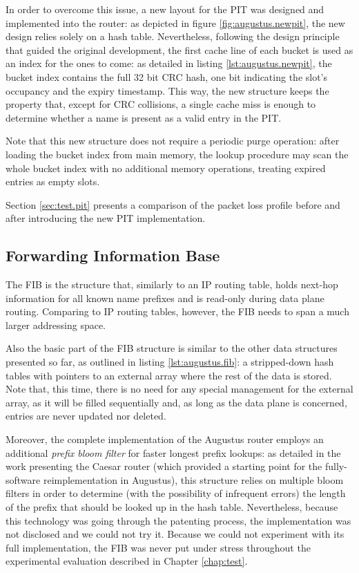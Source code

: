 \documentclass[11pt,a4paper,twoside,titlepage,openany]{book}
\begin{document}
In order to overcome this issue, a new layout for the PIT was designed and implemented into the router: as depicted in figure \ref{fig:augustus.newpit}, the new design relies solely on a hash table. Nevertheless, following the design principle that guided the original development, the first cache line of each bucket is used as an index for the ones to come: as detailed in listing \ref{lst:augustus.newpit}, the bucket index contains the full 32 bit CRC hash, one bit indicating the slot's occupancy and the expiry timestamp. This way, the new structure keeps the property that, except for CRC collisions, a single cache miss is enough to determine whether a name is present as a valid entry in the PIT.

Note that this new structure does not require a periodic purge operation: after loading the bucket index from main memory, the lookup procedure may scan the whole bucket index with no additional memory operations, treating expired entries as empty slots.

Section \ref{sec:test.pit} presents a comparison of the packet loss profile before and after introducing the new PIT implementation.

\subsection{Forwarding Information Base}\label{sec:augustus.fib}
The \gls{FIB} is the structure that, similarly to an IP routing table, holds next-hop information for all known name prefixes and is read-only during data plane routing. Comparing to IP routing tables, however, the \gls{FIB} needs to span a much larger addressing space.

Also the basic part of the FIB structure is similar to the other data structures presented so far, as outlined in listing \ref{lst:augustus.fib}: a stripped-down hash tables with pointers to an external array where the rest of the data is stored. Note that, this time, there is no need for any special management for the external array, as it will be filled sequentially and, as long as the data plane is concerned, entries are never updated nor deleted.

Moreover, the complete implementation of the Augustus router employs an additional \emph{prefix bloom filter} for faster longest prefix lookups: as detailed in the work presenting the Caesar router \cite{caesar} (which provided a starting point for the fully-software reimplementation in Augustus), this structure relies on multiple bloom filters in order to determine (with the possibility of infrequent errors) the length of the prefix that should be looked up in the hash table.
Nevertheless, because this technology was going through the patenting process, the implementation was not disclosed and we could not try it.
Because we could not experiment with its full implementation, the \gls{FIB} was never put under stress throughout the experimental evaluation described in Chapter \ref{chap:test}.
\end{document}
